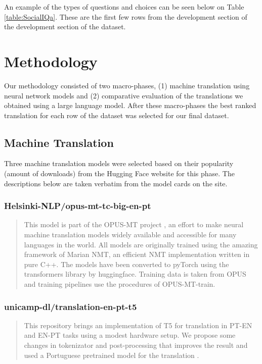 \documentclass{article}
\begin{document}
An example of the types of questions and choices can be seen below on Table
\ref{table:SocialIQa}. These are the first few rows from the development section
of the development section of the dataset.
 

\section{Methodology} 

Our methodology consisted of two macro-phases, (1) machine translation using
neural network models and (2) comparative evaluation of the translations we
obtained using a large language model. After these macro-phases the best ranked
translation for each row of the dataset was selected for our final dataset.

\subsection{Machine Translation}
\label{subsec:machine-translation}

Three machine translation models were selected based on their popularity (amount
of downloads) from the Hugging Face website for this phase. The descriptions
below are taken verbatim from the model cards on the site.

\subsubsection{Helsinki-NLP/opus-mt-tc-big-en-pt}

\begin{quote}
This model is part of the OPUS-MT project \cite{tiedemann2020opus}, an effort to
make neural machine translation models widely available and accessible for many
languages in the world. All models are originally trained using the amazing
framework of Marian NMT, an efficient NMT implementation written in pure C++.
The models have been converted to pyTorch using the transformers library by
huggingface. Training data is taken from OPUS and training pipelines use the
procedures of OPUS-MT-train.
\end{quote}

\subsubsection{unicamp-dl/translation-en-pt-t5}

\begin{quote}
This repository brings an implementation of T5 for translation in PT-EN and
EN-PT tasks using a modest hardware setup. We propose some changes in
tokenizator and post-processing that improves the result and used a Portuguese
pretrained model for the translation \cite{lopes2020lite}.
\end{quote}
\end{document}
